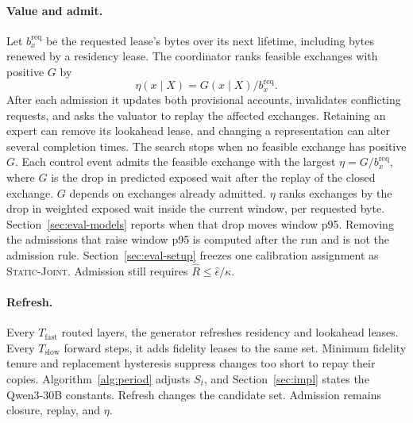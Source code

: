 \paragraph{Value and admit.}
Let \(b_x^{\mathrm{req}}\) be the requested lease's bytes over its next lifetime, including bytes renewed by a residency lease.
The coordinator ranks feasible exchanges with positive \(G\) by
\begin{equation}
  \eta(x\mid X)=G(x\mid X)/b_x^{\mathrm{req}}.
  \label{eq:density}
\end{equation}
After each admission it updates both provisional accounts, invalidates conflicting requests, and asks the valuator to replay the affected exchanges.
Retaining an expert can remove its lookahead lease, and changing a representation can alter several completion times.
The search stops when no feasible exchange has positive \(G\).
Each control event admits the feasible exchange with the largest \(\eta=G/b_x^{\mathrm{req}}\), where \(G\) is the drop in predicted exposed wait after the replay of the closed exchange. \(G\) depends on exchanges already admitted. \(\eta\) ranks exchanges by the drop in weighted exposed wait inside the current window, per requested byte. Section~\ref{sec:eval-models} reports when that drop moves window p95. Removing the admissions that raise window p95 is computed after the run and is not the admission rule. Section~\ref{sec:eval-setup} freezes one calibration assignment as \textsc{Static-Joint}. Admission still requires \(\widehat R\le\widehat\epsilon/\kappa\).

\paragraph{Refresh.}
Every \(T_{\mathrm{fast}}\) routed layers, the generator refreshes residency and lookahead leases.
Every \(T_{\mathrm{slow}}\) forward steps, it adds fidelity leases to the same set.
Minimum fidelity tenure and replacement hysteresis suppress changes too short to repay their copies.
Algorithm~\ref{alg:period} adjusts \(S_t\), and Section~\ref{sec:impl} states the Qwen3-30B constants.
Refresh changes the candidate set.
Admission remains closure, replay, and \(\eta\).

